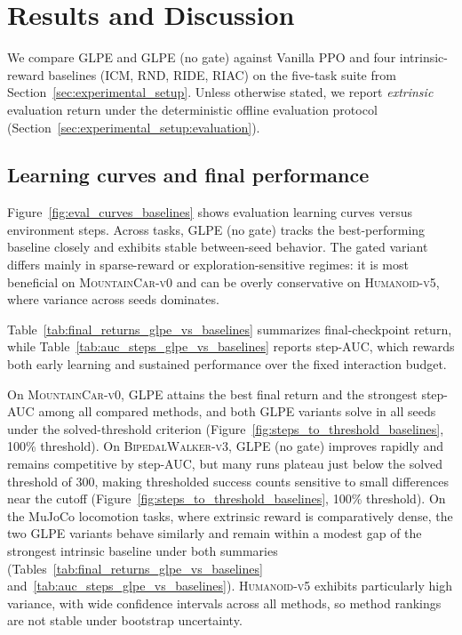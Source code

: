 \section{Results and Discussion}
\label{sec:results}

We compare GLPE and GLPE (no gate) against Vanilla PPO and four intrinsic-reward baselines (ICM, RND, RIDE, RIAC) on the five-task suite from Section~\ref{sec:experimental_setup}.
Unless otherwise stated, we report \emph{extrinsic} evaluation return under the deterministic offline evaluation protocol (Section~\ref{sec:experimental_setup:evaluation}).

\subsection{Learning curves and final performance}

Figure~\ref{fig:eval_curves_baselines} shows evaluation learning curves versus environment steps.
Across tasks, GLPE (no gate) tracks the best-performing baseline closely and exhibits stable between-seed behavior.
The gated variant differs mainly in sparse-reward or exploration-sensitive regimes: it is most beneficial on \textsc{MountainCar-v0} and can be overly conservative on \textsc{Humanoid-v5}, where variance across seeds dominates.



Table~\ref{tab:final_returns_glpe_vs_baselines} summarizes final-checkpoint return, while Table~\ref{tab:auc_steps_glpe_vs_baselines} reports step-AUC, which rewards both early learning and sustained performance over the fixed interaction budget.

On \textsc{MountainCar-v0}, GLPE attains the best final return and the strongest step-AUC among all compared methods, and both GLPE variants solve in all seeds under the solved-threshold criterion (Figure~\ref{fig:steps_to_threshold_baselines}, 100\% threshold).
On \textsc{BipedalWalker-v3}, GLPE (no gate) improves rapidly and remains competitive by step-AUC, but many runs plateau just below the solved threshold of $300$, making thresholded success counts sensitive to small differences near the cutoff (Figure~\ref{fig:steps_to_threshold_baselines}, 100\% threshold).
On the MuJoCo locomotion tasks, where extrinsic reward is comparatively dense, the two GLPE variants behave similarly and remain within a modest gap of the strongest intrinsic baseline under both summaries (Tables~\ref{tab:final_returns_glpe_vs_baselines} and~\ref{tab:auc_steps_glpe_vs_baselines}).
\textsc{Humanoid-v5} exhibits particularly high variance, with wide confidence intervals across all methods, so method rankings are not stable under bootstrap uncertainty.

